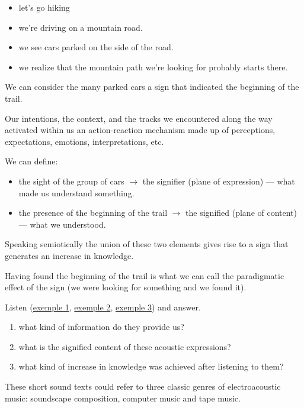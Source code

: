 \begin{itemize}
\tightlist
\item let's go hiking
\item we're driving on a mountain road.
\item we see cars parked on the side of the road.
\item we realize that the mountain path we're looking for probably starts there.
\end{itemize}

We can consider the many parked cars a sign that indicated the beginning of the trail.

Our intentions, the context, and the tracks we encountered along the way activated within us an action-reaction mechanism made up of perceptions, expectations, emotions, interpretations, etc.

We can define:

\begin{itemize}
\tightlist
\item the sight of the group of cars \(\rightarrow\) the signifier (plane of expression) --- what made us understand something.
\item the presence of the beginning of the trail \(\rightarrow\) the signified (plane of content) --- what we understood.
\end{itemize}

Speaking semiotically the union of these two elements gives rise to a sign that generates an increase in knowledge.

Having found the beginning of the trail is what we can call the paradigmatic effect of the sign (we were looking for something and we found it).

Listen (\href{http://www.musicaecodice.it/gitmedia/emc/1_media/uccellini.mp3}{exemple 1}, \href{http://www.musicaecodice.it/gitmedia/emc/1_media/bach_1.mp3}{exemple 2}, \href{http://www.musicaecodice.it/gitmedia/emc/1_media/berio.mp3}{exemple 3}) and answer.

\begin{enumerate}
\def\labelenumi{\arabic{enumi}.}
\tightlist
\item what kind of information do they provide us?
\item what is the signified content of these acoustic expressions?
\item what kind of increase in knowledge was achieved after listening to them?
\end{enumerate}

These short sound texts could refer to three classic genres of electroacoustic music: soundscape composition, computer music and tape music.

